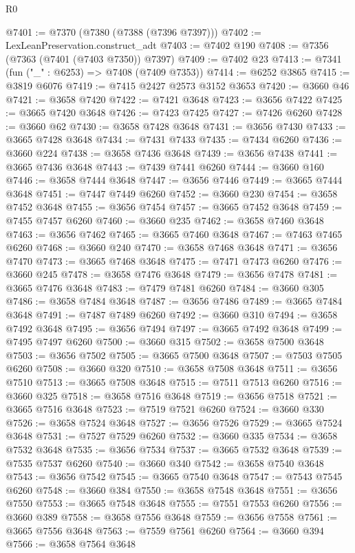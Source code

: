 \begin{lexlean}{R0}
\begin{coremodule}
@7401 := @7370 (@7380 (@7388 (@7396 @7397)))
@7402 := LexLeanPreservation.construct_adt
@7403 := @7402 @190
@7408 := @7356 (@7363 (@7401 (@7403 @7350)) @7397)
@7409 := @7402 @23
@7413 := @7341 (fun ("_" : @6253) => @7408 (@7409 @7353))
@7414 := @6252 @3865
@7415 := @3819 @6076
@7419 := @7415 @2427 @2573 @3152 @3653
@7420 := @3660 @46
@7421 := @3658 @7420
@7422 := @7421 @3648
@7423 := @3656 @7422
@7425 := @3665 @7420 @3648
@7426 := @7423 @7425
@7427 := @7426 @6260
@7428 := @3660 @62
@7430 := @3658 @7428 @3648
@7431 := @3656 @7430
@7433 := @3665 @7428 @3648
@7434 := @7431 @7433
@7435 := @7434 @6260
@7436 := @3660 @224
@7438 := @3658 @7436 @3648
@7439 := @3656 @7438
@7441 := @3665 @7436 @3648
@7443 := @7439 @7441 @6260
@7444 := @3660 @160
@7446 := @3658 @7444 @3648
@7447 := @3656 @7446
@7449 := @3665 @7444 @3648
@7451 := @7447 @7449 @6260
@7452 := @3660 @230
@7454 := @3658 @7452 @3648
@7455 := @3656 @7454
@7457 := @3665 @7452 @3648
@7459 := @7455 @7457 @6260
@7460 := @3660 @235
@7462 := @3658 @7460 @3648
@7463 := @3656 @7462
@7465 := @3665 @7460 @3648
@7467 := @7463 @7465 @6260
@7468 := @3660 @240
@7470 := @3658 @7468 @3648
@7471 := @3656 @7470
@7473 := @3665 @7468 @3648
@7475 := @7471 @7473 @6260
@7476 := @3660 @245
@7478 := @3658 @7476 @3648
@7479 := @3656 @7478
@7481 := @3665 @7476 @3648
@7483 := @7479 @7481 @6260
@7484 := @3660 @305
@7486 := @3658 @7484 @3648
@7487 := @3656 @7486
@7489 := @3665 @7484 @3648
@7491 := @7487 @7489 @6260
@7492 := @3660 @310
@7494 := @3658 @7492 @3648
@7495 := @3656 @7494
@7497 := @3665 @7492 @3648
@7499 := @7495 @7497 @6260
@7500 := @3660 @315
@7502 := @3658 @7500 @3648
@7503 := @3656 @7502
@7505 := @3665 @7500 @3648
@7507 := @7503 @7505 @6260
@7508 := @3660 @320
@7510 := @3658 @7508 @3648
@7511 := @3656 @7510
@7513 := @3665 @7508 @3648
@7515 := @7511 @7513 @6260
@7516 := @3660 @325
@7518 := @3658 @7516 @3648
@7519 := @3656 @7518
@7521 := @3665 @7516 @3648
@7523 := @7519 @7521 @6260
@7524 := @3660 @330
@7526 := @3658 @7524 @3648
@7527 := @3656 @7526
@7529 := @3665 @7524 @3648
@7531 := @7527 @7529 @6260
@7532 := @3660 @335
@7534 := @3658 @7532 @3648
@7535 := @3656 @7534
@7537 := @3665 @7532 @3648
@7539 := @7535 @7537 @6260
@7540 := @3660 @340
@7542 := @3658 @7540 @3648
@7543 := @3656 @7542
@7545 := @3665 @7540 @3648
@7547 := @7543 @7545 @6260
@7548 := @3660 @384
@7550 := @3658 @7548 @3648
@7551 := @3656 @7550
@7553 := @3665 @7548 @3648
@7555 := @7551 @7553 @6260
@7556 := @3660 @389
@7558 := @3658 @7556 @3648
@7559 := @3656 @7558
@7561 := @3665 @7556 @3648
@7563 := @7559 @7561 @6260
@7564 := @3660 @394
@7566 := @3658 @7564 @3648

\end{coremodule}
\end{lexlean}
